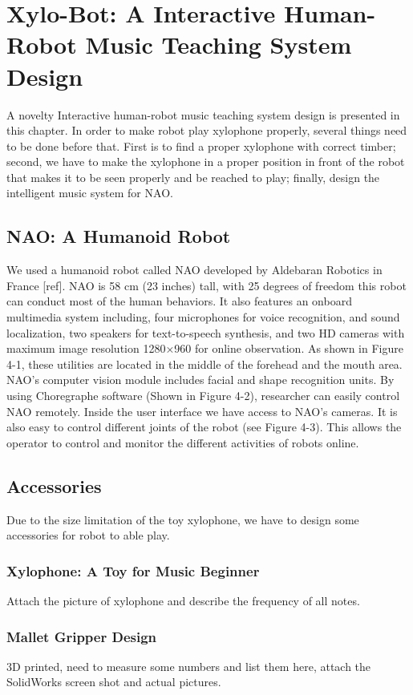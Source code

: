 \chapter{Xylo-Bot: A Interactive Human-Robot Music Teaching System Design} 
A novelty Interactive human-robot music teaching system design is presented in this chapter. In order to make robot play xylophone properly, several things need to be done before that. First is to find a proper xylophone with correct timber; second, we have to make the xylophone in a proper position in front of the robot that makes it to be seen properly and be reached to play; finally, design the intelligent music system for NAO. 

\section{NAO: A Humanoid Robot}
We used a humanoid  robot called NAO developed by Aldebaran Robotics in France [ref]. NAO is 58 cm (23 inches) tall, with 25 degrees of freedom this robot can conduct most of the human behaviors. It also features an onboard multimedia system including, four microphones for voice recognition, and sound localization, two speakers for text-to-speech synthesis, and two HD cameras with maximum image resolution 1280×960 for online observation. As shown in Figure 4-1, these utilities are located in the middle of the forehead and the mouth area. NAO’s computer vision module includes facial and shape recognition units. By using Choregraphe software (Shown  in  Figure 4-2), researcher can easily control NAO remotely. Inside the user interface we have access to NAO’s cameras. It is also easy to control different joints of the robot (see  Figure 4-3). This  allows the operator to control and monitor the different activities of robots online. 

\section{Accessories}
Due to the size limitation of the toy xylophone, we have to design some accessories for robot to able play.

\subsection{Xylophone: A Toy for Music Beginner}
Attach the picture of xylophone and describe the frequency of all notes.

\subsection{Mallet Gripper Design}
3D printed, need to measure some numbers and list them here, attach the SolidWorks
screen shot and actual pictures.

